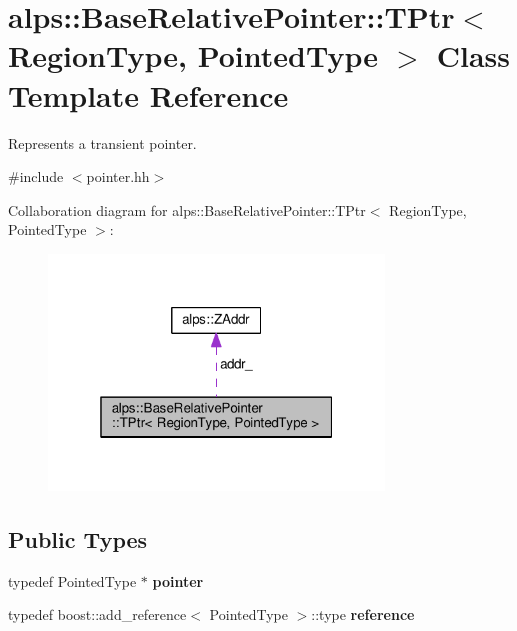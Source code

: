 \hypertarget{classalps_1_1BaseRelativePointer_1_1TPtr}{}\section{alps\+:\+:Base\+Relative\+Pointer\+:\+:T\+Ptr$<$ Region\+Type, Pointed\+Type $>$ Class Template Reference}
\label{classalps_1_1BaseRelativePointer_1_1TPtr}


Represents a transient pointer.  




{\ttfamily \#include $<$pointer.\+hh$>$}



Collaboration diagram for alps\+:\+:Base\+Relative\+Pointer\+:\+:T\+Ptr$<$ Region\+Type, Pointed\+Type $>$\+:
\nopagebreak
\begin{figure}[H]
\begin{center}
\leavevmode
\includegraphics[width=253pt]{classalps_1_1BaseRelativePointer_1_1TPtr__coll__graph}
\end{center}
\end{figure}
\subsection*{Public Types}
\begin{DoxyCompactItemize}
\item 
typedef Pointed\+Type $\ast$ {\bfseries pointer}\hypertarget{classalps_1_1BaseRelativePointer_1_1TPtr_a540d6b534b74d35f28153c81ed6dec57}{}\label{classalps_1_1BaseRelativePointer_1_1TPtr_a540d6b534b74d35f28153c81ed6dec57}

\item 
typedef boost\+::add\+\_\+reference$<$ Pointed\+Type $>$\+::type {\bfseries reference}\hypertarget{classalps_1_1BaseRelativePointer_1_1TPtr_a93313c9c52b5b26d6fb333d4370fce98}{}\label{classalps_1_1BaseRelativePointer_1_1TPtr_a93313c9c52b5b26d6fb333d4370fce98}

\end{DoxyCompactItemize}
